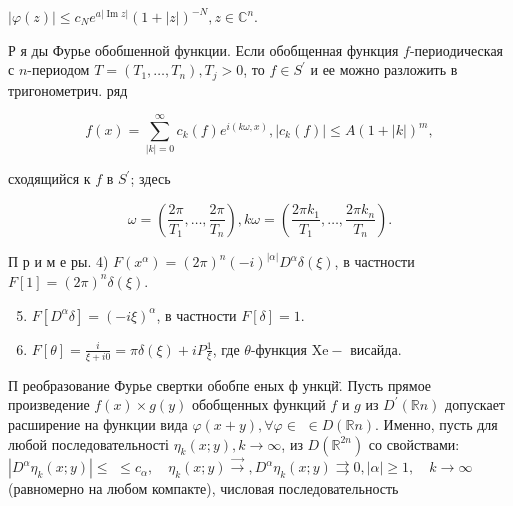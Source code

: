 \documentclass[10pt]{article}
\begin{document}
$|\varphi(z)| \leqslant c_{N} e^{a|\operatorname{Im} z|}(1+|z|)^{-N}, z \in \mathbb{C}^{n}$.



Р я ды Фурье обобшенной функции. Если обобщенная функция $f$-периодическая с $n$-периодом $T=\left(T_{1}, \ldots, T_{n}\right), T_{j}>0$, то $f \in S^{\prime}$ и ее можно разложить в тригонометрич. ряд



\[

f(x)=\sum_{|k|=0}^{\infty} c_{k}(f) e^{i(k \omega, x)},\left|c_{k}(f)\right| \leqslant A(1+|k|)^{m},

\]



сходящийся к $f$ в $S^{\prime}$; здесь



\[

\omega=\left(\frac{2 \pi}{T_{1}}, \ldots, \frac{2 \pi}{T_{n}}\right), k \omega=\left(\frac{2 \pi k_{1}}{T_{1}}, \ldots, \frac{2 \pi k_{n}}{T_{n}}\right) .

\]



П р и м е ры. 4) $F\left(x^{\alpha}\right)=(2 \pi)^{n}(-i)^{|\alpha|} D^{\alpha} \delta(\xi)$, в частности $F[1]=(2 \pi)^{n} \delta(\xi)$.



\begin{enumerate}

  \setcounter{enumi}{4}

  \item $F\left[D^{\alpha} \delta\right]=(-i \xi)^{\alpha}$, в частности $F[\delta]=1$.



  \item $F[\theta]=\frac{i}{\xi+i 0}=\pi \delta(\xi)+i P \frac{1}{\xi}$, где $\theta$-функция $\mathrm{Xe-}$ висайда.



\end{enumerate}



П реобразование Фурье свертки обобпе еных ф ункцй̈. Пусть прямое произведение $f(x) \times g(y)$ обобщенных функций $f$ и $g$ из $D^{\prime}(\mathbb{R} n)$ допускает расширение на функции вида $\varphi(x+y), \forall \varphi \in$ $\in D(\mathbb{R} n)$. Именно, пусть для любой последовательності $\eta_{k}(x ; y), k \rightarrow \infty$, из $D\left(\mathbb{R}^{2 n}\right)$ со свойствами: $\left|D^{\alpha} \eta_{k}(x ; y)\right| \leqslant$ $\leqslant c_{\alpha}, \quad \eta_{k}(x ; y) \stackrel{\rightarrow}{\rightarrow}, D^{\alpha} \eta_{k}(x ; y) \rightrightarrows 0,|\alpha| \geqslant 1, \quad k \rightarrow \infty$ (равномерно на любом компакте), числовая последовательность
\end{document}
